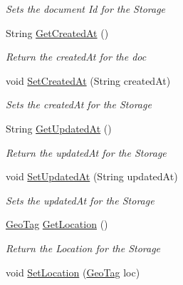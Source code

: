 \begin{DoxyCompactItemize}
\begin{DoxyCompactList}\small\item\em Sets the document Id for the Storage \end{DoxyCompactList}\item 
String \hyperlink{classcom_1_1shephertz_1_1app42_1_1paas_1_1sdk_1_1windows_1_1_meta_response_1_1_j_s_o_n_document_a02dd30a48935a1ff31e69d17a23a62be}{Get\+Created\+At} ()
\begin{DoxyCompactList}\small\item\em Return the created\+At for the doc \end{DoxyCompactList}\item 
void \hyperlink{classcom_1_1shephertz_1_1app42_1_1paas_1_1sdk_1_1windows_1_1_meta_response_1_1_j_s_o_n_document_a6aaa7f63e2655a0c9e6679100f65d570}{Set\+Created\+At} (String created\+At)
\begin{DoxyCompactList}\small\item\em Sets the created\+At for the Storage \end{DoxyCompactList}\item 
String \hyperlink{classcom_1_1shephertz_1_1app42_1_1paas_1_1sdk_1_1windows_1_1_meta_response_1_1_j_s_o_n_document_af9e41dc00f1afc3c7d1a7bcd0553acfa}{Get\+Updated\+At} ()
\begin{DoxyCompactList}\small\item\em Return the updated\+At for the Storage \end{DoxyCompactList}\item 
void \hyperlink{classcom_1_1shephertz_1_1app42_1_1paas_1_1sdk_1_1windows_1_1_meta_response_1_1_j_s_o_n_document_a97f2d6d442b17be1c6282ffc428a6ed6}{Set\+Updated\+At} (String updated\+At)
\begin{DoxyCompactList}\small\item\em Sets the updated\+At for the Storage \end{DoxyCompactList}\item 
\hyperlink{classcom_1_1shephertz_1_1app42_1_1paas_1_1sdk_1_1windows_1_1storage_1_1_geo_tag}{Geo\+Tag} \hyperlink{classcom_1_1shephertz_1_1app42_1_1paas_1_1sdk_1_1windows_1_1_meta_response_1_1_j_s_o_n_document_a83ed2940c74073c5df69bd70f0466fcb}{Get\+Location} ()
\begin{DoxyCompactList}\small\item\em Return the Location for the Storage \end{DoxyCompactList}\item 
void \hyperlink{classcom_1_1shephertz_1_1app42_1_1paas_1_1sdk_1_1windows_1_1_meta_response_1_1_j_s_o_n_document_a7b4e93ccb0ae4d2cc4a967994d1a114f}{Set\+Location} (\hyperlink{classcom_1_1shephertz_1_1app42_1_1paas_1_1sdk_1_1windows_1_1storage_1_1_geo_tag}{Geo\+Tag} loc)

\end{DoxyCompactItemize}
